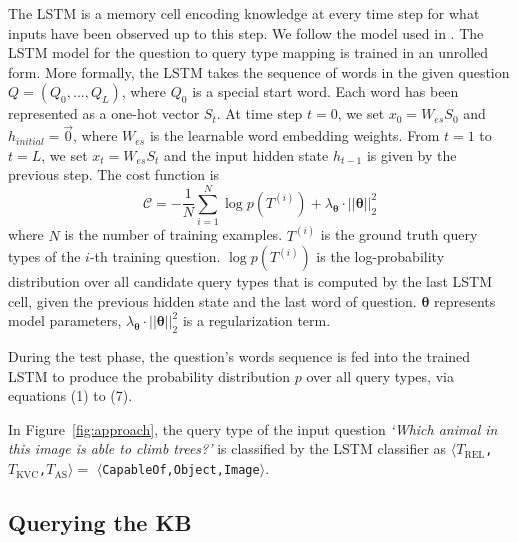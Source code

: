 \documentclass[10pt,journal]{IEEEtran}
\def\ModParms{{\boldsymbol \theta}}
\begin{document}
The LSTM is a memory cell encoding knowledge at every time step for what inputs have been observed up to this step. We follow the model used in \cite{qi2015caption}. 
The LSTM model for the question to query type mapping is trained in an unrolled form. More formally, the LSTM takes the sequence of words in the given question $Q=(Q_0,...,Q_L)$, where $Q_0$ is a special start word. Each word has been represented as a one-hot vector $S_t$. At time step $t=0$, we set $x_0=W_{es}S_0$ and $h_{initial}=\vec{0}$, where $W_{es}$ is the learnable word embedding weights. From $t=1$ to $t=L$, we set $x_t=W_{es}S_t$ and the input hidden state $h_{t-1}$ is given by the previous step. The cost function is
\begin{equation}
 \mathcal{C}=-\frac{1}{N}\sum_{i=1}^N\log p(T^{(i)})+\lambda_\ModParms\cdot||\ModParms||_2^2
\end{equation}
where $N$ is the number of training examples. $T^{(i)}$ is the ground truth query types of the $i$-th training question. $\log p(T^{(i)})$ is the log-probability distribution over all candidate query types that is computed by the last LSTM cell, given the previous hidden state and the last word of question. $\ModParms$ represents model parameters, $\lambda_\ModParms\cdot||\ModParms||_2^2$ is a regularization term.

During the test phase, the question's words sequence is fed into the trained LSTM to produce the probability distribution $p$ over all query types, via equations (1) to (7).

In Figure~\ref{fig:approach}, the query type of the input question 
{\em `Which animal in this image is able to climb trees?'}
is classified by the LSTM classifier as $\langle$\texttt{\texttt{$T_{\mbox{REL}}$},\texttt{$T_{\mbox{KVC}}$},\texttt{$T_{\mbox{AS}}$}}$\rangle$$=$
$\langle$\texttt{CapableOf,Object,Image}$\rangle$.




\subsection{Querying the KB}
\label{sec:querying}
\end{document}
